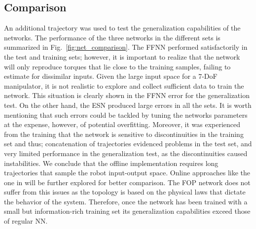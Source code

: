 \subsection{Comparison}
An additional trajectory was used to test the generalization capabilities of the networks. The performance of the three networks in the different sets is summarized in Fig.~\ref{fig:net_comparison}. The FFNN performed satisfactorily in the test and training sets; however, it is important to realize that the network will only reproduce torques that lie close to the training samples, failing to estimate for dissimilar inputs. Given the large input space for a 7-DoF manipulator, it is not realistic to explore and collect sufficient data to train the network. This situation is clearly shown in the FFNN error for the generalization test. On the other hand, the ESN produced large errors in all the sets. It is worth mentioning that such errors could be tackled by tuning the networks parameters at the expense, however, of potential overfitting. Moreover, it was experienced from the training that the network is sensitive to discontinuities in the training set and thus; concatenation of trajectories evidenced problems in the test set, and very limited performance in the generalization test, as the discontinuities caused instabilities. We conclude that the offline implementation requires long trajectories that sample the robot input-output space. Online approaches like the one in \cite{PolydorosNalKru2015} will be further explored for better comparison. The FOP network does not suffer from this issues as the topology is based on the physical laws that dictate the behavior of the system. Therefore, once the network has been trained with a small but information-rich training set its generalization capabilities exceed those of regular NN.
